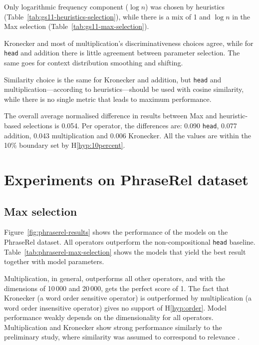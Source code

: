 Only logarithmic frequency component ($\log n$) was chosen by heuristics (Table~\ref{tab:gs11-heuristics-selection}), while there is a mix of 1 and $\log n$ in the Max selection (Table~\ref{tab:gs11-max-selection}).

Kronecker and most of multiplication's discriminativeness choices agree, while for \texttt{head} and addition there is little agreement between parameter selection. The same goes for context distribution smoothing and shifting.

Similarity choice is the same for Kronecker and addition, but \texttt{head} and multiplication---according to heuristics---should be used with cosine similarity, while there is no single metric that leads to maximum performance.

The overall average normalised difference in results between Max and heuristic-based selections is 0.054. Per operator, the differences are: 0.090 \texttt{head}, 0.077 addition, 0.043 multiplication and 0.006 Kronecker. All the values are within the 10\% boundary set by H\ref{hyp:10percent}.

\section{Experiments on PhraseRel dataset}
\label{sec:phraserel-experiment}

\subsection{Max selection}
\label{sec:max-selection-phraserel}



Figure~\ref{fig:phraserel-results} shows the performance of the models on the PhraseRel dataset. All operators outperform the non-compositional \texttt{head} baseline. Table~\ref{tab:phraserel-max-selection} shows the models that yield the best result together with model parameters.

Multiplication, in general, outperforms all other operators, and with the dimensions of 10\,000 and 20\,000, gets the perfect score of 1. The fact that Kronecker (a word order sensitive operator) is outperformed by multiplication (a word order insensitive operator) gives no support of H\ref{hyp:order}. Model performance weakly depends on the dimensionality for all operators. Multiplication and Kronecker show strong performance similarly to the preliminary study, where similarity was assumed to correspond to relevance \cite{Milajevs:2015:IMN:2808194.2809448}.

